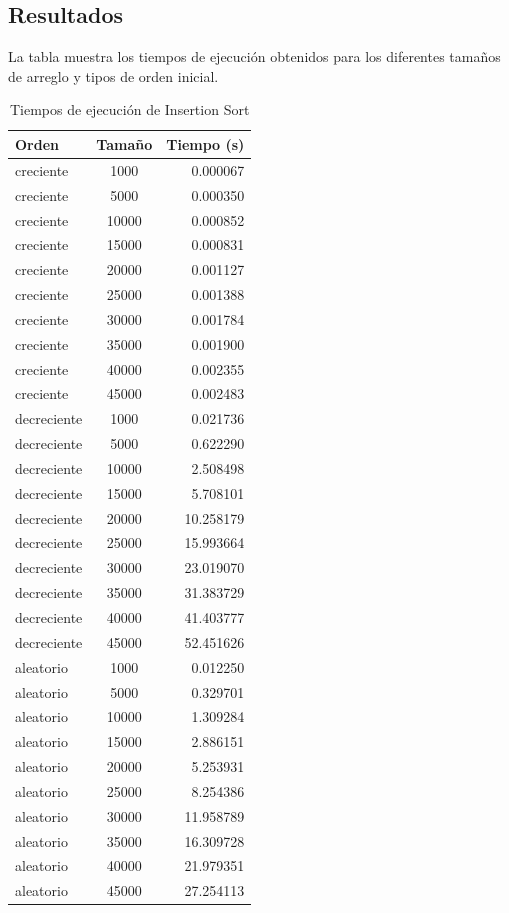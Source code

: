 \documentclass[a4paper, 11pt]{article}
\begin{document}
\newpage
\subsection{Resultados}
La tabla muestra los tiempos de ejecución obtenidos para los diferentes tamaños de arreglo y tipos de orden inicial.

\begin{table}[H]
\centering
\begin{tabular}{|l|c|r|}
\hline
Orden & Tamaño & Tiempo (s) \\
\hline
creciente & 1000 & 0.000067 \\
creciente & 5000 & 0.000350 \\
creciente & 10000 & 0.000852 \\
creciente & 15000 & 0.000831 \\
creciente & 20000 & 0.001127 \\
creciente & 25000 & 0.001388 \\
creciente & 30000 & 0.001784 \\
creciente & 35000 & 0.001900 \\
creciente & 40000 & 0.002355 \\
creciente & 45000 & 0.002483 \\
\hline
decreciente & 1000 & 0.021736 \\
decreciente & 5000 & 0.622290 \\
decreciente & 10000 & 2.508498 \\
decreciente & 15000 & 5.708101 \\
decreciente & 20000 & 10.258179 \\
decreciente & 25000 & 15.993664 \\
decreciente & 30000 & 23.019070 \\
decreciente & 35000 & 31.383729 \\
decreciente & 40000 & 41.403777 \\
decreciente & 45000 & 52.451626 \\
\hline
aleatorio & 1000 & 0.012250 \\
aleatorio & 5000 & 0.329701 \\
aleatorio & 10000 & 1.309284 \\
aleatorio & 15000 & 2.886151 \\
aleatorio & 20000 & 5.253931 \\
aleatorio & 25000 & 8.254386 \\
aleatorio & 30000 & 11.958789 \\
aleatorio & 35000 & 16.309728 \\
aleatorio & 40000 & 21.979351 \\
aleatorio & 45000 & 27.254113 \\
\hline
\end{tabular}
\caption{Tiempos de ejecución de Insertion Sort}
\end{table}
\end{document}
